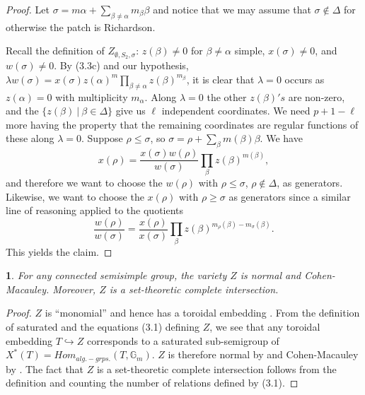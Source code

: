 \documentclass[12pt,letterpaper]{amsart}
\newcommand{\proclaimname}{}
\newtheorem*{proclaimx}{\proclaimname}
\newenvironment{proclaim}[1]%
  {\renewcommand{\proclaimname}{#1}\begin{proclaimx}}{\end{proclaimx}}
\begin{document}
\begin{proof} Let $\sigma=m\alpha +\sum_{\beta\not= \alpha}m_\beta\beta$
and notice that we may assume that
$\sigma\notin \Delta$ for otherwise the patch is Richardson.

Recall the definition of $Z_{\emptyset,S_2,\sigma}$: $z(\beta)\not= 0$
for $\beta\not=\alpha$ simple, $x(\sigma)\not= 0$, and
$w(\sigma)\not= 0$. By (3.3c) and our hypothesis,
$\lambda w(\sigma)
=x(\sigma)z(\alpha)^m\prod_{\beta\not= \alpha}z(\beta)^{m_\beta}$,
it is clear that
$\lambda=0$ occurs as $z(\alpha)=0$
with multiplicity $m_\alpha$. Along $\lambda=0$ the other $z(\beta)'s$
are non-zero,
and the $\{z(\beta)\ |\ \beta\in\Delta\}$
give us $\ell$ independent coordinates. We need
$p+1-\ell$ more having the property that the remaining coordinates
are regular functions of these along $\lambda =0$. Suppose
$\rho \leq\sigma$, so $\sigma=\rho +\sum_\beta m(\beta)\beta$.
We have
\[
x(\rho)=\frac{x(\sigma)w(\rho)}{w(\sigma)}
\prod_\beta z(\beta)^{m(\beta)},
\]
and therefore we want to choose the $w(\rho)$ with $\rho \leq\sigma$,
$\rho\notin \Delta$,
as generators. Likewise, we want to choose the $x(\rho)$ with
$\rho \geq\sigma$ as generators since a similar line of reasoning applied
to the quotients
\[
\frac{w(\rho)}{w(\sigma)}=\frac{x(\rho)}{x(\sigma)}\prod_\beta
z(\beta)^{m_\rho(\beta)-m_{\sigma}(\beta)}.
\]
This yields the claim.
\end{proof}

\begin{proclaim}{Lemma 3.7} For any connected semisimple group,
the variety $Z$ is normal and Cohen-Macauley.
Moreover, $Z$ is a set-theoretic complete intersection.
\end{proclaim}

\begin{proof} $Z$ is ``monomial'' and hence has a toroidal
embedding \cite[Ch I]{Ke72}. From the definition of saturated
\cite[Ch I, Definition 2]{Ke72} and the equations (3.1)
defining $Z$, we see that any toroidal embedding
$T\hookrightarrow Z$ corresponds to a saturated sub-semigroup of
$X^*(T)=Hom_{alg.-grps.}(T,{\mathbb G}_m)$. $Z$ is therefore
normal by \cite[Ch I, Theorem 1]{Ke72} and Cohen-Macauley
by \cite[Ch I, Theorem 14]{Ke72}.
The fact that $Z$ is a set-theoretic
complete intersection follows from the definition
and counting the number of relations defined by (3.1).
\end{proof}
\end{document}
